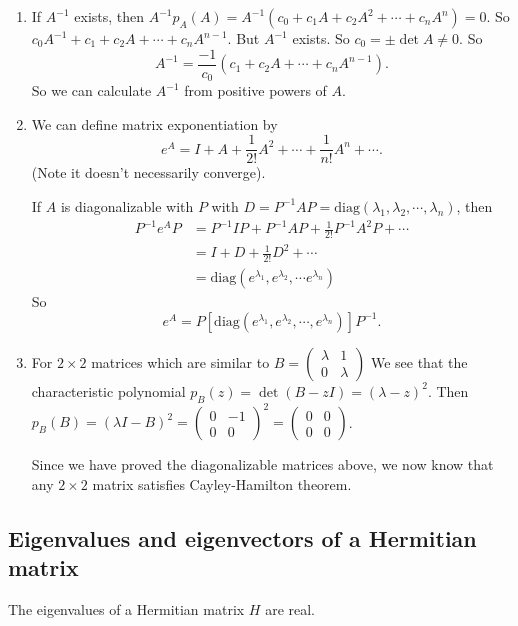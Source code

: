 \documentclass[a4paper]{article}
\begin{document}
  \note
  \begin{enumerate}
    \item If $A^{-1}$ exists, then $A^{-1} p_A(A) = A^{-1}(c_0 + c_1A + c_2A^2 + \cdots + c_n A^n) = 0$. So $c_0 A^{-1} + c_1 + c_2A + \cdots + c_n A^{n - 1}$. But $A^{-1}$ exists. So $c_0 = \pm \det A \not= 0$. So
      \[
        A^{-1} = \frac{-1}{c_0}(c_1 + c_2 A + \cdots + c_n A^{n -1}).
      \]
      So we can calculate $A^{-1}$ from positive powers of $A$.
    \item We can define matrix exponentiation by
      \[
        e^A = I + A + \frac{1}{2!}A^2 + \cdots + \frac{1}{n!}A^n + \cdots.
      \]
      (Note it doesn't necessarily converge).

      If $A$ is diagonalizable with $P$ with $D = P^{-1}AP = \mathrm{diag}(\lambda_1, \lambda_2, \cdots, \lambda_n)$, then
      \begin{align*}
        P^{-1}e^A P &= P^{-1}IP + P^{-1}AP + \frac{1}{2!}P^{-1}A^2P + \cdots\\
        &= I + D + \frac{1}{2!}D^{2} + \cdots\\
        &= \mathrm{diag}(e^{\lambda_1}, e^{\lambda_2}, \cdots e^{\lambda_n})
      \end{align*}
      So
      \[
        e^A = P[\mathrm{diag}(e^{\lambda_1}, e^{\lambda_2}, \cdots, e^{\lambda_n})]P^{-1}.
      \]
    \item For $2\times 2$ matrices which are similar to $B = 
      \begin{pmatrix}
        \lambda & 1\\
        0 & \lambda
      \end{pmatrix}$
      We see that the characteristic polynomial $p_B(z) = \det (B - zI) = (\lambda - z)^2$. Then $p_B(B) = (\lambda I - B)^2 = 
      \begin{pmatrix}
        0 & -1\\
        0 & 0
      \end{pmatrix}^2 = 
      \begin{pmatrix}
        0 & 0\\
        0 & 0
      \end{pmatrix}$.

      Since we have proved the diagonalizable matrices above, we now know that any $2\times 2$ matrix satisfies Cayley-Hamilton theorem. 
  \end{enumerate}

  \subsection{Eigenvalues and eigenvectors of a Hermitian matrix}
  \begin{thm}
    The eigenvalues of a Hermitian matrix $H$ are real.
  \end{thm}
\end{document}
